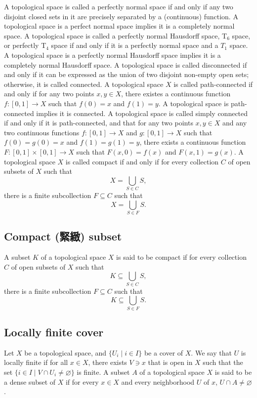 \documentclass[a4paper,12pt]{article}
\begin{document}
A topological space is called a perfectly normal space if and only if any two disjoint closed sets in it are precisely separated by a (continuous) function. A topological space is a perfect normal space implies it is a completely normal space.
A topological space is called a perfectly normal Hausdorff space, T$_6$ space, or perfectly T$_4$ space if and only if it is a perfectly normal space and a $T_1$ space. A topological space is a perfectly normal Hausdorff space implies it is a completely normal Hausdorff space.
A topological space is called disconnected if and only if it can be expressed as the union of two disjoint non-empty open sets; otherwise, it is called connected.
A topological space $X$ is called path-connected if and only if for any two points $x,y\in X$, there existes a continuous function $f\colon[0,1]\to X$ such that $f(0)=x$ and $f(1)=y$. A topological space is path-connected implies it is connected.
A topological space is called simply connected if and only if it is path-connected, and that for any two points $x,y\in X$ and any two continuous functions $f\colon[0,1]\to X$ and $g\colon[0,1]\to X$ such that $f(0)=g(0)=x$ and $f(1)=g(1)=y$, there exists a continuous function $F\colon[0,1]\times[0,1]\to X$ such that $F(x,0)=f(x)$ and $F(x,1)=g(x)$.
A topological space $X$ is called compact if and only if for every collection $C$ of open subsets of $X$ such that
\[X=\bigcup_{S\in C}S,\]
there is a finite subcollection $F\subseteq C$ such that
\[X=\bigcup _{S\in F}S.\]
\subsection{Compact (緊緻) subset}
A subset $K$ of a topological space $X$ is said to be compact if for every collection $C$ of open subsets of $X$ such that
\[K\subseteq\bigcup_{S\in C}S,\]
there is a finite subcollection $F\subseteq C$ such that
\[K\subseteq\bigcup _{S\in F}S.\]
\subsection{Locally finite cover}
Let $X$ be a topological space, and $\{U_i\mid i\in I\}$ be a cover of $X$. We say that $U$ is locally finite if for all $x\in X$, there exists $V\ni x$ that is open in $X$ such that the set $\{i\in I\mid V\cap U_i\neq\varnothing\}$ is finite.
A subset $A$ of a topological space $X$ is said to be a dense subset of $X$ if for every $x\in X$ and every neighborhood $U$ of $x$, $U\cap A\neq\varnothing$.
\end{document}
